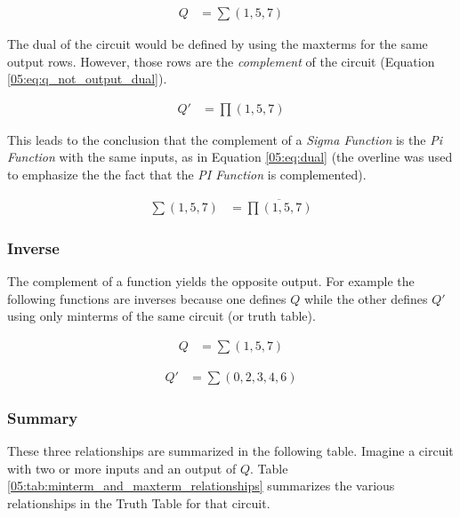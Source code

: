 \begin{align}
  \label{05:eq:q_output_dual}
  Q &= \sum(1,5,7)
\end{align}

The dual of the circuit would be defined by using the maxterms for the same output rows. However, those rows are the \emph{complement} of the circuit (Equation \ref{05:eq:q_not_output_dual}).

\begin{align}
  \label{05:eq:q_not_output_dual}
  Q' &= \prod(1,5,7)
\end{align}

This leads to the conclusion that the complement of a \textit{Sigma Function} is the \textit{Pi Function} with the same inputs, as in Equation \ref{05:eq:dual} (the overline was used to emphasize the the fact that the \textit{PI Function} is complemented).

\begin{align}
  \label{05:eq:dual}
  \sum(1,5,7) &= \overline{\prod(1,5,7)}
\end{align}


\subsubsection{Inverse}
\label{05:subsubsec:inverse}

The complement of a function yields the opposite output. For example the following functions are inverses because one defines $ Q $ while the other defines $ Q' $ using only minterms of the same circuit (or truth table).

\begin{align}
  \label{05:eq:q_output_inverse}
  Q &= \sum(1,5,7)
\end{align}

\begin{align}
  \label{05:eq:q_not_output_inverse}
  Q' &= \sum(0,2,3,4,6)
\end{align}

\subsubsection{Summary}
\label{05:subsubsec:summary_minterm_and_maxterm_relationships}

These three relationships are summarized in the following table. Imagine a circuit with two or more inputs and an output of  $ Q $. Table \ref{05:tab:minterm_and_maxterm_relationships} summarizes the various relationships in the Truth Table for that circuit.

